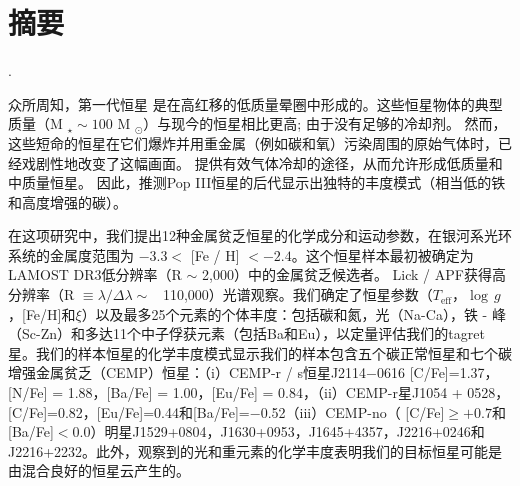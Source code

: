 
\maketitle
\MAKETITLE
\makedeclaration



\intobmk\chapter*{摘\quad 要}
\setcounter{page}{1}
.  %

众所周知，第一代恒星 是在高红移的低质量晕圈中形成的。这些恒星物体的典型质量（M $ _ {\star} \sim 100 $ M  $_{\odot} $）与现今的恒星相比更高; 由于没有足够的冷却剂。 然而，这些短命的恒星在它们爆炸并用重金属（例如碳和氧）污染周围的原始气体时，已经戏剧性地改变了这幅画面。 提供有效气体冷却的途径，从而允许形成低质量和中质量恒星。 因此，推测Pop III恒星的后代显示出独特的丰度模式（相当低的铁和高度增强的碳）。


在这项研究中，我们提出12种金属贫乏恒星的化学成分和运动参数，在银河系光环系统的金属度范围为 $-3.3 <$ [Fe / H] $ < -  2.4 $。这个恒星样本最初被确定为LAMOST DR3低分辨率（R $ \sim $ 2,000）中的金属贫乏候选者。 Lick / APF获得高分辨率（R $ \equiv \lambda / \Delta \lambda \sim $ ~110,000）光谱观察。我们确定了恒星参数（\ensuremath{T_\mathrm{eff}}，\ensuremath{\log\,g}，[Fe/H]和$\xi$）以及最多25个元素的个体丰度：包括碳和氮，光（Na-Ca），铁 - 峰（Sc-Zn）和多达11个中子俘获元素（包括Ba和Eu），以定量评估我们的tagret星。我们的样本恒星的化学丰度模式显示我们的样本包含五个碳正常恒星和七个碳增强金属贫乏（CEMP）恒星：（i）CEMP-r / s恒星J2114$-$0616 [C/Fe]=1.37，[N/Fe] = 1.88，[Ba/Fe] = 1.00，[Eu/Fe] = 0.84，（ii）CEMP-r星J1054 + 0528，[C/Fe]=0.82，[Eu/Fe]=0.44和[Ba/Fe]=$-$0.52（iii）CEMP-no（ [C/Fe]$\geqslant+0.7$和[Ba/Fe]$<0.0$）明星J1529+0804，J1630+0953，J1645+4357，J2216+0246和J2216+2232。此外，观察到的光和重元素的化学丰度表明我们的目标恒星可能是由混合良好的恒星云产生的。


